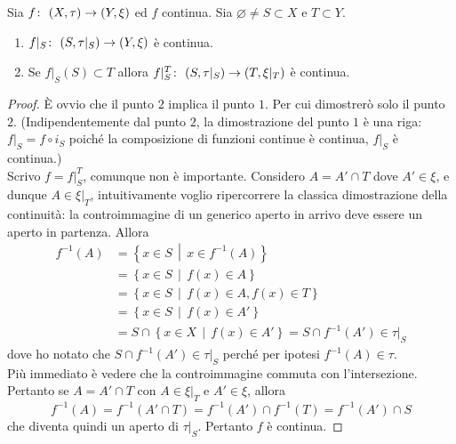 \newpage
\begin{theorem}
	Sia $f \colon\ (X,\tau) \rightarrow (Y,\xi)$ ed $f$ continua. Sia $\varnothing \neq S \subset X$ e $T \subset Y$.
	\begin{enumerate}
		\item $f|_S \colon\ (S, \tau|_S) \rightarrow (Y, \xi)$ è continua.
		\item Se $f|_S(S) \subset T$ allora $f|^T_S \colon\ (S, \tau|_S) \rightarrow (T, \xi|_T)$ è continua.
	\end{enumerate}
\end{theorem}
\begin{proof}
	È ovvio che il punto $2$ implica il punto $1$. Per cui dimostrerò solo il punto $2$. (Indipendentemente dal punto $2$, la dimostrazione del punto $1$ è una riga: $f|_S = f \circ i_S$ poiché la composizione di funzioni continue è continua, $f|_S$ è continua.)\\
	
	Scrivo $f = f|^T_S$, comunque non è importante. Considero $A = A' \cap T$ dove $A' \in \xi$, e dunque $A \in \xi|_T$, intuitivamente voglio ripercorrere la classica dimostrazione della continuità: la controimmagine di un generico aperto in arrivo deve essere un aperto in partenza. Allora 
	\begin{align*}
		f^{-1}(A) & = \left\{x \in  S \,\middle|\, x \in f^{-1}(A) \right\}\\
					  & = \left\{x \in  S \,\middle|\, f(x) \in A \right\} \\
					  & = \left\{x \in  S \,\middle|\, f(x) \in A , f(x) \in T \right\} \\
					  & = \left\{x \in  S \,\middle|\, f(x) \in A'\right\} \\
					  & = S \cap \left\{x \in  X \,\middle|\, f(x) \in A'\right\} = S \cap f^{-1}(A') \in \tau|_S
	\end{align*}
	dove ho notato che $S \cap f^{-1}(A') \in \tau|_S$ perché per ipotesi $f^{-1}(A) \in \tau$.\\
	
	Più immediato è vedere che la controimmagine commuta con l'intersezione. Pertanto se $A = A' \cap T$ con $A \in \xi|_T$ e $A' \in \xi$, allora 
	\begin{equation*}
			f^{-1}(A) = f^{-1} (A' \cap T) = f^{-1}(A') \cap f^{-1}(T) = f^{-1}(A') \cap S
	\end{equation*} 
	che diventa quindi un aperto di $\tau|_S$. Pertanto $f$ è continua.
\end{proof}
